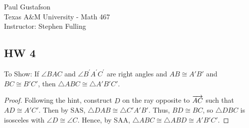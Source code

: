 \documentclass{article}
\begin{document}
\noindent Paul Gustafson\\
\noindent Texas A\&M University - Math 467\\ 
\noindent Instructor: Stephen Fulling

\subsection*{HW 4}
 To Show: If $\angle BAC$ and $\angle B^\prime A^\prime C^\prime$ are right angles and $AB \cong A'B'$ and $BC \cong B'C'$, then $\triangle ABC \cong \triangle A'B'C'$.
\begin{proof}
Following the hint, construct $D$ on the ray opposite to $\overrightarrow{AC}$ such that $AD \cong A'C'$.  Then by SAS, $\triangle DAB \cong \triangle C'A'B'$. Thus, $BD \cong BC$, so $\triangle DBC$ is isosceles with $\angle D \cong \angle C$.  Hence, by SAA, $\triangle ABC \cong \triangle ABD \cong A'B'C'$.
\end{proof}
\end{document}
